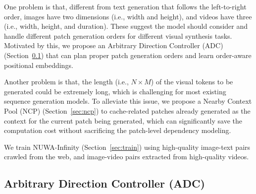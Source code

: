 \documentclass{article}
\begin{document}
One problem is that, different from text generation that follows the left-to-right order, images have two dimensions (i.e., width and height), and videos have three (i.e., width, height, and duration). These suggest the model should consider and handle different patch generation orders for different visual synthesis tasks. Motivated by this, we propose an Arbitrary Direction Controller (ADC) (Section~\ref{sec:adc}) that can plan proper patch generation orders and learn order-aware positional embeddings.

Another problem is that, the length (i.e., $N \times M$) of the visual tokens to be generated could be extremely long, which is challenging for most existing sequence generation models. To alleviate this issue, we propose a Nearby Context Pool (NCP) (Section~\ref{sec:ncp}) to cache-related patches already generated as the context for the current patch being generated, which can significantly save the computation cost without sacrificing the patch-level dependency modeling.

We train NUWA-Infinity (Section~\ref{sec:train}) using high-quality image-text pairs crawled from the web, and image-video pairs extracted from high-quality videos.














































 














\subsection{Arbitrary Direction Controller (ADC)}\label{sec:adc}
\end{document}
